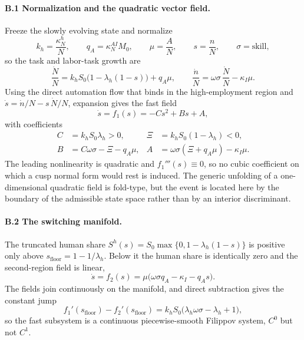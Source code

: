 \documentclass[review,12pt]{elsarticle}
\theoremstyle{plain}
\theoremstyle{definition}
\theoremstyle{remark}
\begin{document}
\paragraph{B.1 Normalization and the quadratic vector field.}
Freeze the slowly evolving state and normalize
\begin{equation*}
k_h=\frac{\kappa_N^h}{N},\qquad q_A=\kappa_N^{AI}M_0,\qquad
\mu=\frac{A}{N},\qquad s=\frac{n}{N},\qquad \sigma=\text{skill},
\end{equation*}
so the task and labor-task growth are
\begin{equation*}
\frac{\dot N}{N}=k_hS_0\bigl(1-\lambda_h(1-s)\bigr)+q_A\mu,\qquad
\frac{\dot n}{N}=\omega\sigma\,\frac{\dot N}{N}-\kappa_I\mu.
\end{equation*}
Using the direct automation flow that binds in the high-employment region and
$\dot s=\dot n/N-s\,\dot N/N$, expansion gives the fast field
\begin{equation*}
\dot s=f_1(s)=-Cs^2+Bs+A,
\end{equation*}
with coefficients
\begin{align*}
C&=k_hS_0\lambda_h>0, & \Xi&=k_hS_0(1-\lambda_h)<0,\\
B&=C\omega\sigma-\Xi-q_A\mu, &
A&=\omega\sigma(\Xi+q_A\mu)-\kappa_I\mu.
\end{align*}
The leading nonlinearity is quadratic and $f_1'''(s)\equiv0$, so no cubic
coefficient on which a cusp normal form would rest is induced. The generic
unfolding of a one-dimensional quadratic field is fold-type, but the event is
located here by the boundary of the admissible state space rather than by an
interior discriminant.

\paragraph{B.2 The switching manifold.}
The truncated human share $S^h(s)=S_0\max\{0,1-\lambda_h(1-s)\}$ is positive
only above $s_{\text{floor}}=1-1/\lambda_h$. Below it the human share is
identically zero and the second-region field is linear,
\begin{equation*}
\dot s=f_2(s)=\mu\bigl(\omega\sigma q_A-\kappa_I-q_A s\bigr).
\end{equation*}
The fields join continuously on the manifold, and direct subtraction gives the
constant jump
\begin{equation}
f_1'(s_{\text{floor}})-f_2'(s_{\text{floor}})
=k_hS_0\bigl(\lambda_h\omega\sigma-\lambda_h+1\bigr),
\label{app:jump}
\end{equation}
so the fast subsystem is a continuous piecewise-smooth Filippov system, $C^0$
but not $C^1$.
\end{document}
